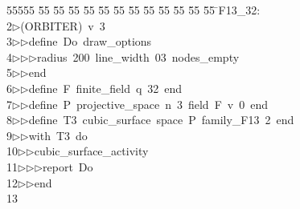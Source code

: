 %
%
\begin{tabbing}
55555 \= 55 \= 55 \= 55 \= 55 \= 55 \= 55 \= 55 \= 55 \= 55 \= 55 \= 55 \= 55 \= \>F13\_32:\\[0pt]
2\>$\triangleright$\>(ORBITER)\ v\ 3\ \\[0pt]
3\>$\triangleright$\>$\triangleright$\>define\ Do\ draw\_options\ \\[0pt]
4\>$\triangleright$\>$\triangleright$\>$\triangleright$\>radius\ 200\ line\_width\ 03\ nodes\_empty\ \\[0pt]
5\>$\triangleright$\>$\triangleright$\>end\ \\[0pt]
6\>$\triangleright$\>$\triangleright$\>define\ F\ finite\_field\ q\ 32\ end\ \\[0pt]
7\>$\triangleright$\>$\triangleright$\>define\ P\ projective\_space\ n\ 3\ field\ F\ v\ 0\ end\ \\[0pt]
8\>$\triangleright$\>$\triangleright$\>define\ T3\ cubic\_surface\ space\ P\ family\_F13\ 2\ end\ \\[0pt]
9\>$\triangleright$\>$\triangleright$\>with\ T3\ do\ \\[0pt]
10\>$\triangleright$\>$\triangleright$\>cubic\_surface\_activity\ \\[0pt]
11\>$\triangleright$\>$\triangleright$\>$\triangleright$\>report\ Do\ \\[0pt]
12\>$\triangleright$\>$\triangleright$\>end\\[0pt]
13\>\end{tabbing}

